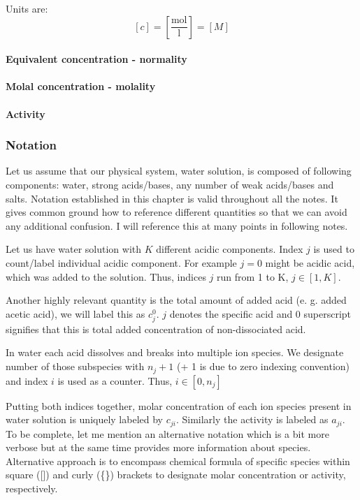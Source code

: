 Units are:
\[\left[c\right]=\left[\frac{\text{mol}}{\text{l}}\right]= [M]\]


\paragraph*{Equivalent concentration - normality}
\paragraph*{Molal concentration - molality}
\paragraph*{Activity}


\subsubsection{Notation}

Let us assume that our physical system, water solution, is composed of following components:
water, strong acids/bases, any number of weak acids/bases and salts. Notation established in this
chapter is valid throughout all the notes. It gives common ground how to reference different quantities
so that we can avoid any additional confusion. I will reference this at many points in following notes.

Let us have water solution with $K$ different acidic components. Index $j$ is used to count/label
individual acidic component. For example $j=0$ might be acidic acid, which was added to the solution. Thus, indices $j$ run from 1 to K, $j \in [1, K]$.

Another highly relevant quantity is the total amount of added acid (e. g. added acetic acid),
we will label this as $c^0_{j}$. $j$ denotes the specific acid and $0$ superscript signifies
that this is total added concentration of non-dissociated acid.

In water each acid dissolves and breaks into multiple ion species. We designate number of
those subspecies with $n_j + 1$ (+ 1 is due to zero indexing convention)
and index $i$ is used as a counter.
Thus, $i \in [0, n_j]$

Putting both indices together, molar concentration of each ion species present in
water solution is uniquely labeled by $c_{ji}$. Similarly the activity is labeled as
$a_{ji}$. To be complete, let me mention an alternative notation which is a bit more verbose
but at the same time provides more information about species. Alternative approach is to encompass
chemical formula of specific species within  square ([]) and curly (\{\}) brackets to designate
molar concentration or activity, respectively.

